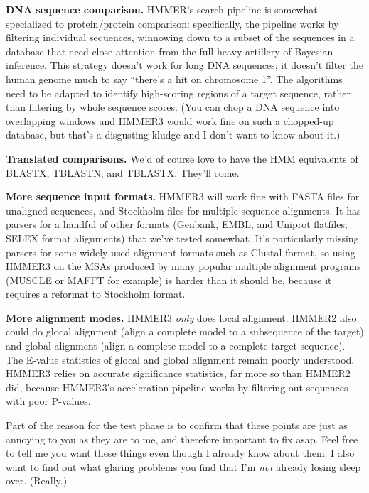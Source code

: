 \textbf{DNA sequence comparison.} HMMER's search pipeline is somewhat
specialized to protein/protein comparison: specifically, the pipeline
works by filtering individual sequences, winnowing down to a subset of
the sequences in a database that need close attention from the full
heavy artillery of Bayesian inference. This strategy doesn't work for
long DNA sequences; it doesn't filter the human genome much to say
``there's a hit on chromosome 1''. The algorithms need to be adapted
to identify high-scoring regions of a target sequence, rather than
filtering by whole sequence scores. (You can chop a DNA sequence into
overlapping windows and HMMER3 would work fine on such a chopped-up
database, but that's a disgusting kludge and I don't want to know
about it.)

\textbf{Translated comparisons.} We'd of course love to have the HMM
equivalents of BLASTX, TBLASTN, and TBLASTX. They'll come.

\textbf{More sequence input formats.} HMMER3 will work fine with FASTA
files for unaligned sequences, and Stockholm files for multiple
sequence alignments. It has parsers for a handful of other formats
(Genbank, EMBL, and Uniprot flatfiles; SELEX format alignments) that
we've tested somewhat. It's particularly missing parsers for some
widely used alignment formats such as Clustal format, so using HMMER3
on the MSAs produced by many popular multiple alignment programs
(MUSCLE or MAFFT for example) is harder than it should be, because it
requires a reformat to Stockholm format.

\textbf{More alignment modes.} HMMER3 \emph{only} does local
alignment. HMMER2 also could do glocal alignment (align a complete
model to a subsequence of the target) and global alignment (align a
complete model to a complete target sequence). The E-value statistics
of glocal and global alignment remain poorly understood. HMMER3 relies
on accurate significance statistics, far more so than HMMER2 did,
because HMMER3's acceleration pipeline works by filtering out
sequences with poor P-values.

\begin{sidebar}
Part of the reason for the test phase is to confirm that these points
are just as annoying to you as they are to me, and therefore important
to fix asap. Feel free to tell me you want these things even though I
already know about them. I also want to find out what glaring problems
you find that I'm \emph{not} already losing sleep over. (Really.)
\end{sidebar}



